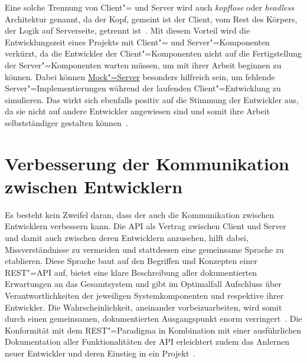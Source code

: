 Eine solche Trennung von Client"= und Server wird auch \emph{kopflose} oder \emph{\foreignlanguage{american}{headless}} Architektur genannt, da der Kopf, gemeint ist der Client, vom Rest des Körpers, der Logik auf Serverseite, getrennt ist~\cite[5]{kul23}.
Mit diesem Vorteil wird die Entwicklungszeit eines Projekts mit Client"= und Server"=Komponenten verkürzt, da die Entwickler der Client"=Komponenten nicht auf die Fertigstellung der Server"=Komponenten warten müssen, um mit ihrer Arbeit beginnen zu können.
Dabei können \hyperref[sec:mock-server]{Mock"=Server} besonders hilfreich sein, um fehlende Server"=Implementierungen während der laufenden Client"=Entwicklung zu simulieren.
Das wirkt sich ebenfalls positiv auf die Stimmung der Entwickler aus, da sie nicht auf andere Entwickler angewiesen sind und somit ihre Arbeit selbstständiger gestalten können~\cite[351]{de23}.

\section{Verbesserung der Kommunikation zwischen Entwicklern}
Es besteht kein Zweifel daran, dass der \AFA auch die Kommunikation zwischen Entwicklern verbessern kann.
Die \ac{API} als Vertrag zwischen Client und Server und damit auch zwischen deren Entwicklern anzusehen, hilft dabei, Missverständnisse zu vermeiden und stattdessen eine gemeinsame Sprache zu etablieren. Diese Sprache baut auf den Begriffen und Konzepten einer \acs{REST}"=\acs{API} auf, bietet eine klare Beschreibung aller dokumentierten Erwartungen an das Gesamtsystem und gibt im Optimalfall Aufschluss über Verantwortlichkeiten der jeweiligen Systemkomponenten und respektive ihrer Entwickler.
Die Wahrscheinlichkeit, aneinander vorbeizuarbeiten, wird somit durch einen gemeinsamen, dokumentierten Ausgangspunkt enorm verringert~\cite[1628]{cha21}.
Die Konformität mit dem \ac{REST}"=Paradigma in Kombination mit einer ausführlichen Dokumentation aller Funktionalitäten der \ac{API} erleichtert zudem das Anlernen neuer Entwickler und deren Einstieg in ein Projekt~\cite[355]{de23}.

